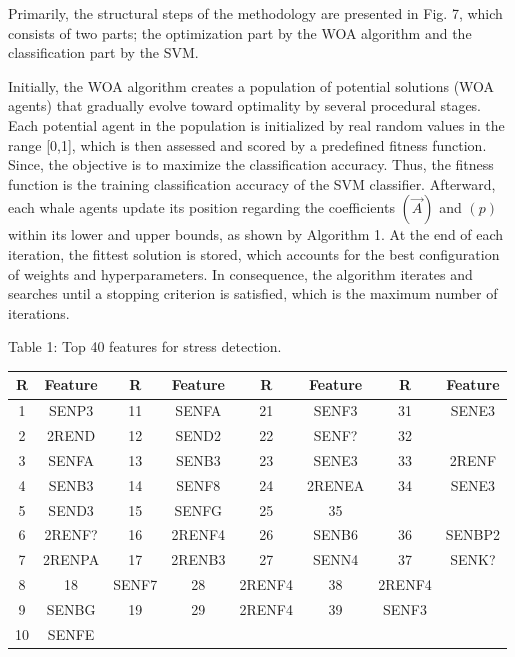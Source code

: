 Primarily, the structural steps of the methodology are presented in Fig. 7, which consists of two parts; the optimization part by the WOA algorithm and the classification part by the SVM.

Initially, the WOA algorithm creates a population of potential solutions (WOA agents) that gradually evolve toward optimality by several procedural stages. Each potential agent in the population is initialized by real random values in the range [0,1], which is then assessed and scored by a predefined fitness function. Since, the objective is to maximize the classification accuracy. Thus, the fitness function is the training classification accuracy of the SVM classifier. Afterward, each whale agents update its position regarding the coefficients $(\vec{A})$ and $(p)$ within its lower and upper bounds, as shown by Algorithm 1. At the end of each iteration, the fittest solution is stored, which accounts for the best configuration of weights and hyperparameters. In consequence, the algorithm iterates and searches until a stopping criterion is satisfied, which is the maximum number of iterations.

Table 1: Top 40 features for stress detection.


\begin{table}[htbp]
\centering
\begin{tabular}{|c|c|c|c|c|c|c|c|}\hline
R & Feature & R & Feature & R & Feature & R & Feature \\ \hline
1 & SENP3 & 11 & SENFA & 21 & SENF3 & 31 & SENE3 \\ \hline
2 & 2REND & 12 & SEND2 & 22 & SENF? & 32 &  \\ \hline
3 & SENFA & 13 & SENB3 & 23 & SENE3 & 33 & 2RENF \\ \hline
4 & SENB3 & 14 & SENF8 & 24 & 2RENEA & 34 & SENE3 \\ \hline
5 & SEND3 & 15 & SENFG & 25 & 35 &  &  \\ \hline
6 & 2RENF? & 16 & 2RENF4 & 26 & SENB6 & 36 & SENBP2 \\ \hline
7 & 2RENPA & 17 & 2RENB3 & 27 & SENN4 & 37 & SENK? \\ \hline
8 & 18 & SENF7 & 28 & 2RENF4 & 38 & 2RENF4 &  \\ \hline
9 & SENBG & 19 & 29 & 2RENF4 & 39 & SENF3 &  \\ \hline
10 & SENFE &  &  &  &  &  &  \\ \hline
\end{tabular}\end{table}

